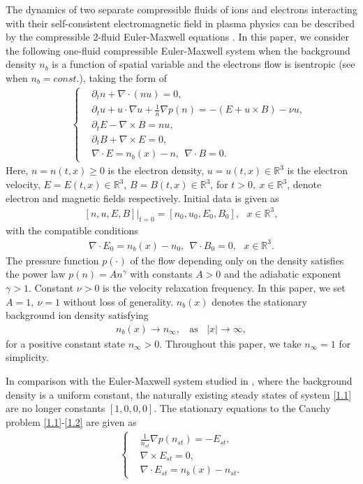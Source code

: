 \documentclass[11pt]{amsart}
\numberwithin{equation}{section}
\begin{document}
The dynamics of two separate compressible fluids of ions and
electrons interacting with their self-consistent electromagnetic
field in plasma physics can be described by the compressible 2-fluid
Euler-Maxwell equations \cite{Besse,Rishbeth}. In this paper, we
consider the following one-fluid compressible Euler-Maxwell system
when the background density $n_{b}$ is a function of spatial
variable and the electrons flow is isentropic (see
\cite{Duan,UK,USK} when $n_{b}=const.$), taking the form of
\begin{eqnarray}\label{1.1}
&&\left\{\begin{aligned}
&\partial_t n+\nabla\cdot(nu)=0,\\
&\partial_t u+u \cdot \nabla u+\frac{1}{n}\nabla
p(n)=-(E+u\times B)-\nu u,\\
&\partial_t E-\nabla\times B=nu,\\
&\partial_t B+\nabla \times E=0,\\
&\nabla \cdot E=n_{b}(x)-n, \ \  \nabla \cdot B=0.
\end{aligned}\right.
\end{eqnarray}
Here, $n=n(t,x)\geq 0 $ is the  electron density, $ u=u(t,x)\in
\mathbb{R}^{3}$ is the electron velocity, $ E=E(t,x)\in
\mathbb{R}^{3}$, $ B=B(t,x)\in \mathbb{R}^{3}$, for $ t>0, \ x \in
\mathbb{R}^{3} $, denote electron and  magnetic fields respectively.
Initial data is given as
\begin{eqnarray}\label{1.2}
[n,u,E,B]|_{t=0}=[n_{0},u_{ 0},E_{0},B_0],\ \ \ x\in\mathbb{R}^{3},
\end{eqnarray}
with the compatible conditions
\begin{eqnarray}\label{1.3}
\nabla \cdot E_0=n_{b}(x)-n_{0}, \ \  \nabla \cdot B_0=0, \ \ \
x\in\mathbb{R}^{3}.
\end{eqnarray}
The pressure function $ p(\cdot)$ of the flow depending only on the
density satisfies the power law $p(n)=A n^{\gamma}$ with constants
$A>0$ and the adiabatic exponent  $\gamma >1 $. Constant $\nu>0$ is
the velocity relaxation frequency. In this paper, we set $ A=1,\
\nu=1$ without loss of generality. $n_{b}(x)$ denotes the stationary
background ion density satisfying
\begin{eqnarray*}
n_{b}(x)\rightarrow n_{\infty}, \ \ \ \  \textrm{as}\ \ \ \
|x|\rightarrow \infty,
\end{eqnarray*}
for a positive constant state $n_{\infty}>0$. Throughout this paper,
we take $n_{\infty}=1$ for simplicity.

In comparison with the Euler-Maxwell system studied in \cite{Duan},
where the background density is a uniform constant, the naturally
existing steady states of system \eqref{1.1} are no longer constants
$[1,0,0,0]$. The stationary equations to the Cauchy problem
\eqref{1.1}-\eqref{1.2} are given as
\begin{eqnarray}\label{sta.eq0}
\left\{\begin{aligned} &\frac{1}{n_{st}}\nabla
p(n_{st})=-E_{st},\\
&\nabla \times E_{st}=0,\\
&\nabla \cdot E_{st}=n_{b}(x)-n_{st}.
\end{aligned}\right.
\end{eqnarray}
\end{document}

